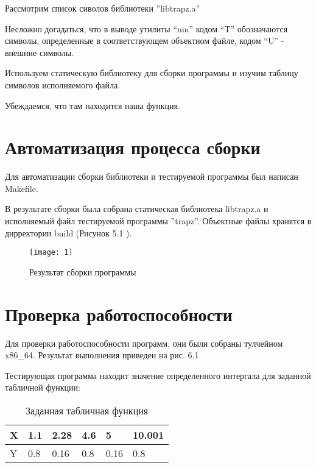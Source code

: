 Рассмотрим список сиволов библиотеки ''libtrapz.a''


\parindent=1cm

Несложно догадаться, что в выводе утилиты “nm” кодом “T” обозначаются символы,
определенные в соответствующем объектном файле, кодом “U” - внешние символы.

Используем статическую библиотеку для сборки программы и изучим таблицу символов исполняемого файла.


\parindent=1cm

Убеждаемся, что там находится наша функция.

\section{Автоматизация процесса сборки}
Для автоматизации сборки библиотеки и тестируемой программы был написан Makefile.


\parindent=1cm

В результате сборки была собрана статическая библиотека libtrapz.a и исполняемый файл тестируемой программы ''trapz''. Объектные файлы хранятся в дирректории build (Рисунок 5.1 ).

\begin{figure}[H]
	\begin{center}
		\texttt{[image: 1]}
		\caption{Результат сборки программы} 
		\label{pic:pic_name} %
	\end{center}
\end{figure}

\section{Проверка работоспособности}
Для проверки работоспособности программ, они были собраны тулчейном x86\_64. Результат выполнения приведен на рис. 6.1

Тестирующая программа находит значение определенного интергала для заданной табличной функции:
\begin{table}[H]
	\caption{Заданная табличная функция}
	\begin{center}
		\begin{tabular}{|l|l|l|l|l|l|}
			\hline
			X  & 1.1 & 2.28 & 4.6 & 5    & 10.001\\ \hline
			Y  & 0.8 & 0.16 & 0.8 & 0.16 & 0.8\\ \hline
		\end{tabular}
		\label{tabular:tab_examp}
	\end{center}
\end{table}

